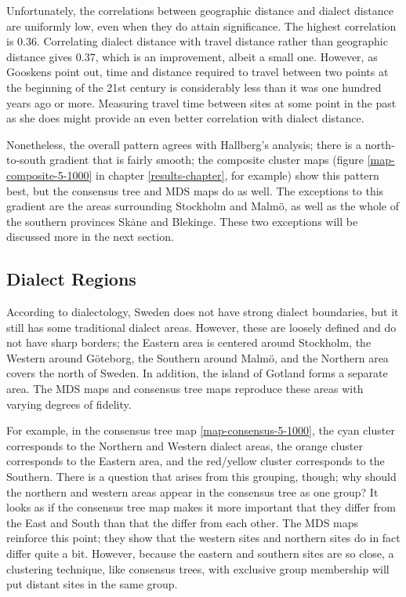 Unfortunately, the correlations between geographic distance and
dialect distance are uniformly low, even when they do attain
significance. The highest correlation is 0.36. Correlating dialect
distance with travel distance rather than geographic distance gives
0.37, which is an improvement, albeit a small one. However, as
Gooskens point out, time and distance required to travel between two
points at the beginning of the 21st century is considerably less than
it was one hundred years ago or more. Measuring travel time between
sites at some point in the past as she does might provide an even
better correlation with dialect distance.

Nonetheless, the overall pattern agrees with Hallberg's analysis;
there is a north-to-south gradient that is fairly smooth; the
composite cluster maps (figure \ref{map-composite-5-1000} in chapter
\ref{results-chapter}, for example) show this pattern best, but the
consensus tree and MDS maps do as well. The exceptions to this
gradient are the areas surrounding Stockholm and Malm\"o, as well as
the whole of the southern provinces Sk\.ane and Blekinge. These two
exceptions will be discussed more in the next section.

\subsection{Dialect Regions}

According to dialectology, Sweden does not have strong dialect
boundaries, but it still has some traditional dialect areas. However,
these are loosely defined and do not have sharp borders; the Eastern
area is centered around Stockholm, the Western around G\"oteborg, the
Southern around Malm\"o, and the Northern area covers the north of
Sweden. In addition, the island of Gotland forms a separate area. The
MDS maps and consensus tree maps reproduce these areas with varying
degrees of fidelity.

For example, in the consensus tree map \ref{map-consensus-5-1000}, the
cyan cluster corresponds to the Northern and Western dialect areas,
the orange cluster corresponds to the Eastern area, and the red/yellow
cluster corresponds to the Southern. There is a question that arises
from this grouping, though; why should the northern and western areas
appear in the consensus tree as one group? It looks as if the
consensus tree map makes it more important that they differ from the
East and South than that the differ from each other. The MDS maps
reinforce this point; they show that the western sites and northern sites
do in fact differ quite a bit. However, because the eastern and
southern sites are so close, a clustering technique, like consensus
trees, with exclusive group membership will put distant sites in the
same group.

